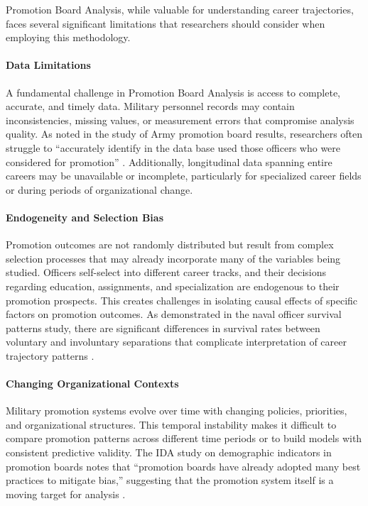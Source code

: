\documentclass[../main.tex]{subfiles}
\begin{document}
Promotion Board Analysis, while valuable for understanding career trajectories, faces several significant limitations that researchers should consider when employing this methodology.

\paragraph{Data Limitations}
A fundamental challenge in Promotion Board Analysis is access to complete, accurate, and timely data. Military personnel records may contain inconsistencies, missing values, or measurement errors that compromise analysis quality. As noted in the study of Army promotion board results, researchers often struggle to ``accurately identify in the data base used those officers who were considered for promotion'' \citep{army_promotion_analysis}. Additionally, longitudinal data spanning entire careers may be unavailable or incomplete, particularly for specialized career fields or during periods of organizational change.

\paragraph{Endogeneity and Selection Bias}
Promotion outcomes are not randomly distributed but result from complex selection processes that may already incorporate many of the variables being studied. Officers self-select into different career tracks, and their decisions regarding education, assignments, and specialization are endogenous to their promotion prospects. This creates challenges in isolating causal effects of specific factors on promotion outcomes. As demonstrated in the naval officer survival patterns study, there are significant differences in survival rates between voluntary and involuntary separations that complicate interpretation of career trajectory patterns \citep{naval_survival}.

\paragraph{Changing Organizational Contexts}
Military promotion systems evolve over time with changing policies, priorities, and organizational structures. This temporal instability makes it difficult to compare promotion patterns across different time periods or to build models with consistent predictive validity. The IDA study on demographic indicators in promotion boards notes that ``promotion boards have already adopted many best practices to mitigate bias,'' suggesting that the promotion system itself is a moving target for analysis \citep{ida2024}.
\end{document}
